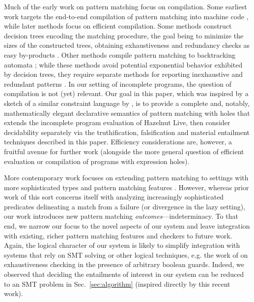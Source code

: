 Much of the early work on pattern matching focus on compilation. Some earliest work targets the end-to-end compilation of pattern matching into machine code \cite{DBLP:conf/lfp/Cardelli84,DBLP:conf/lfp/Augustsson84,DBLP:conf/fpca/Augustsson85}, while later methods focus on efficient compilation. Some methods construct decision trees encoding the matching procedure, the goal being to minimize the sizes of the constructed trees, obtaining exhaustiveness and redundancy checks as easy by-products \cite{Aitken92smlnj,Baudinet85treepattern,Sestoft96mlpattern}.
Other methods compile pattern matching to backtracking automata \cite{Maranget94lazybacktracking,DBLP:journals/jfp/Maranget07};
while these methods avoid potential exponential behavior exhibited by decision trees, they require separate methods for reporting inexhaustive and redundant patterns \cite{DBLP:journals/jfp/Maranget07}.
In our setting of incomplete programs, the question of compilation is not (yet) relevant. Our goal in this paper, which was inspired by a sketch of a similar constraint language by \citet{Harper2012}, is to provide a complete and, notably, mathematically elegant declarative semantics of pattern matching with holes that extends the incomplete program evaluation of Hazelnut Live, then consider decidability separately via the truthification, falsification and material entailment techniques described in this paper.  
Efficiency considerations are, however, a fruitful avenue for further work (alongside the more general question of efficient evaluation or compilation of programs with expression holes).

More contemporary work focuses on extending pattern matching to settings with more sophisticated types and pattern matching features \cite{DBLP:conf/icfp/VazouSJVJ14,DBLP:journals/pacmpl/CockxA18,DBLP:conf/itp/Sozeau10,DBLP:conf/icfp/KarachaliasSVJ15,DBLP:journals/pacmpl/GrafJS20,DBLP:journals/jfp/ConventLMM20}.
However, whereas prior work of this sort concerns itself with analyzing increasingly sophisticated predicates delineating a match from a failure (or divergence in the lazy setting), our work introduces new pattern matching \emph{outcomes}---indeterminacy.
To that end, we narrow our focus to the novel aspects of our system and leave integration with existing, richer pattern matching features and checkers to future work. Again, the logical character of our system is likely to simplify integration with systems that rely on SMT solving or other logical techniques, e.g. the work of \citet{DBLP:journals/pacmpl/GrafJS20} on exhaustiveness checking in the presence of arbitrary boolean guards. Indeed, we observed that deciding the entailments of interest in our system can be reduced to an SMT problem in Sec.~\ref{sec:algorithm} (inspired directly by this recent work).

